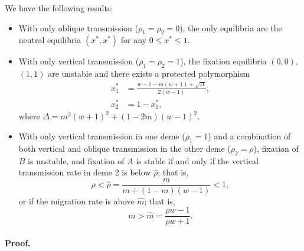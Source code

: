 \documentclass[14pt]{extarticle}
\begin{document}
We have the following results:
\begin{itemize}
\item With only oblique transmission ($\rho_1=\rho_2=0$), the only equilibria are the neutral equilibria $(x^*,x^*)$ for any $0 \le x^* \le 1$.
\item With only vertical transmission ($\rho_1=\rho_2=1$), the fixation equilibria  $(0,0)$, $(1,1)$ are unstable and there exists a protected polymorphism
\begin{equation}
\begin{aligned} \label{eq:migration_model_unconditional_symmetric_polymorphism}
x_1^* &= \frac{w-1-m(w+1) + \sqrt{\Delta}}{2(w-1)}, \\
x_2^* &= 1-x_1^*,
\end{aligned}
\end{equation}
where $\Delta = m^2(w+1)^2+(1-2m)(w-1)^2$.
\item With only vertical transmission in one deme ($\rho_1=1$) and a combination of both vertical and oblique transmission in the other deme ($\rho_2=\rho$), fixation of $B$ is unstable, and fixation of $A$ is stable if and only if the vertical transmission rate in deme 2 is below $\hat \rho$; that is,
\begin{equation} \label{eq:migration_model_unconditional_symmetric_condition_rho}
\rho < \hat \rho = \frac{m}{m+(1-m)(w-1)} < 1,
\end{equation}
or if the migration rate is above $\hat m$; that is,
\begin{equation} \label{eq:migration_model_unconditional_symmetric_condition_m}
m > \hat m = \frac{\rho w - 1}{\rho w + 1}.
\end{equation}
\end{itemize}

\paragraph{Proof.}

\end{document}
